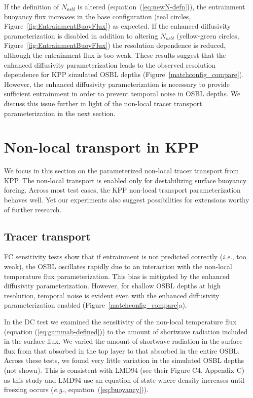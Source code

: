 \documentclass[preprint,12pt,authoryear]{agujournal}
\begin{document}
If the definition of $N_{osbl}$ is altered (equation~(\ref{eq:newN-defn})), the entrainment buoyancy flux increases in the base configuration (teal circles, Figure~\ref{fig:EntrainmentBuoyFlux}) as expected.  If the enhanced diffusivity parameterization is disabled in addition to altering $N_{osbl}$ (yellow-green circles, Figure~\ref{fig:EntrainmentBuoyFlux}) the resolution dependence is reduced, although the entrainment flux is too weak.  These results suggest that the enhanced diffusivity parameterization leads to the observed resolution dependence for KPP simulated OSBL depths (Figure~\ref{matchconfig_compare}).  However, the enhanced diffusivity parameterization is necessary to provide sufficient entrainment in order to prevent temporal noise in OSBL depths.  We discuss this issue further in light of the non-local tracer transport parameterization in the next section.

\section{Non-local transport in KPP}
\label{section:NLresults}
We focus in this section on the parameterized non-local tracer transport from KPP. The non-local transport is enabled only for destabilizing surface buoyancy forcing.  Across most test cases, the KPP non-local transport parameterization behaves well.  Yet our experiments also suggest possibilities for extensions worthy of further research. 

\subsection{Tracer transport}
\label{section:results-tracertrans}

FC sensitivity tests show that if entrainment is not predicted correctly (\textit{i.e.}, too weak), the OSBL oscillates rapidly due to an interaction with the non-local temperature flux parameterization.  This bias is mitigated by the enhanced diffusivity parameterization.  However, for shallow OSBL depths at high resolution, temporal noise is evident even with the enhanced diffusivity parameterization enabled (Figure~\ref{matchconfig_compare}a).

In the DC test we examined the sensitivity of the non-local temperature flux (equation (\ref{eq:gammab-defined})) to the amount of shortwave radiation included in the surface flux.  We varied the amount of shortwave radiation in the surface flux from that absorbed in the top layer to that absorbed in the entire OSBL.  Across these tests, we found very little variation in the simulated OSBL depths (not shown).  This is consistent with LMD94 (see their Figure C4, Appendix C) as this study and LMD94 use an equation of state where density increases until freezing occurs (\textit{e.g.}, equation~(\ref{eq:buoyancy})).  
\end{document}
